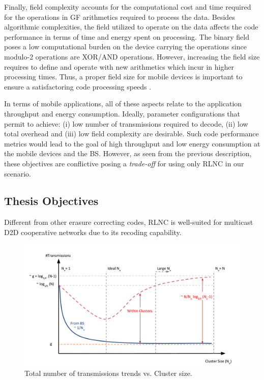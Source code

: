Finally, field complexity accounts for the computational cost and time required for the operations in \ac{GF} arithmetics required to process the data. Besides algorithmic complexities, the field utilized to operate on the data affects the code performance in terms of time and energy spent on processing. The binary field poses a low computational burden on the device carrying the operations since modulo-2 operations are XOR/AND operations. However, increasing the field size requires to define and operate with new arithmetics which incur in higher processing times. Thus, a proper field size for mobile devices is important to ensure a satisfactoring code processing speeds \cite{heide2009network,paramanathan2013lean}.

In terms of mobile applications, all of these aspects relate to the application throughput and energy consumption. Ideally, parameter configurations that permit to achieve: (i) low number of transmissions required to decode, (ii) low total overhead and (iii) low field complexity are desirable. Such code performance metrics would lead to the goal of high throughput and low energy consumption at the mobile devices and the \ac{BS}. However, as seen from the previous description, these objectives are conflictive posing a \textit{trade-off} for using only \ac{RLNC} in our scenario.

\subsection{Thesis Objectives}
Different from other erasure correcting codes, \ac{RLNC} is well-suited for multicast \ac{D2D} cooperative networks due to its recoding capability.


\begin{figure}[h]
  \centering
  \includegraphics[width=\textwidth]{introduction/figures/cloud_sizes.pdf}
  \caption{Total number of transmissions trends vs. Cluster size.}
\label{fig:proposal}
\end{figure}

